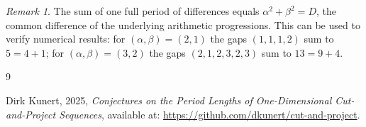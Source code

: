 \documentclass[11pt]{article}
\theoremstyle{plain}
\theoremstyle{remark}
\newtheorem{remark}{Remark}
\begin{document}
\begin{remark}
The sum of one full period of differences equals $\alpha^2+\beta^2 = D$,
the common difference of the underlying arithmetic progressions.
This can be used to verify numerical results:
for $(\alpha,\beta) = (2,1)$ the gaps $(1,1,1,2)$ sum to $5 = 4+1$;
for $(\alpha,\beta) = (3,2)$ the gaps $(2,1,2,3,2,3)$ sum to $13 = 9+4$.
\end{remark}

\begin{thebibliography}{9}

Dirk Kunert, 2025,
\emph{Conjectures on the Period Lengths of One-Dimensional Cut-and-Project Sequences},
available at: \url{https://github.com/dkunert/cut-and-project}.

\end{thebibliography}
\end{document}
